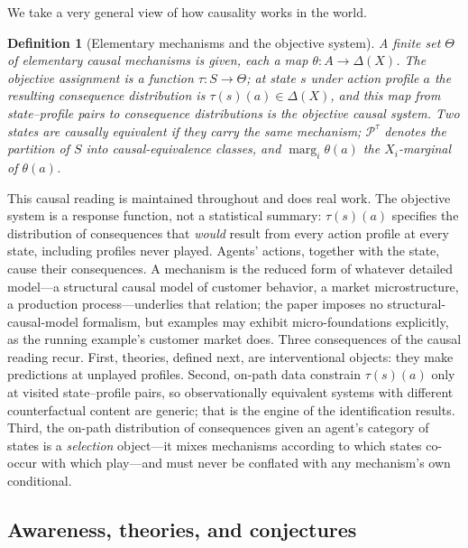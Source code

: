 \documentclass[11pt]{article}
\newtheorem{definition}[assumption]{Definition}
\theoremstyle{definition}
\newcommand{\marg}[1]{\operatorname{marg}_{#1}}
\begin{document}
We take a very general view of how causality works in the world. 


\begin{definition}[Elementary mechanisms and the objective system]
\label{def:mechanisms}
A finite set $\Theta$ of \emph{elementary causal mechanisms} is given, each a map $\theta:A\to\Delta(X)$.
The \emph{objective assignment} is a function $\tau:S\to\Theta$; at state $s$ under action profile $a$ the resulting consequence distribution is $\tau(s)(a)\in\Delta(X)$, and this map from state--profile pairs to consequence distributions is the \emph{objective causal system}.
Two states are \emph{causally equivalent} if they carry the same mechanism; $\mathcal P^{\tau}$ denotes the partition of $S$ into causal-equivalence classes, and $\marg{i}\theta(a)$ the $X_i$-marginal of $\theta(a)$.
\end{definition}

This causal reading is maintained throughout and does real work.
The objective system is a response function, not a statistical summary: $\tau(s)(a)$ specifies the distribution of consequences that \emph{would} result from every action profile at every state, including profiles never played.
Agents' actions, together with the state, cause their consequences.
A mechanism is the reduced form of whatever detailed model---a structural causal model of customer behavior, a market microstructure, a production process---underlies that relation; the paper imposes no structural-causal-model formalism, but examples may exhibit micro-foundations explicitly, as the running example's customer market does.
Three consequences of the causal reading recur.
First, theories, defined next, are interventional objects: they make predictions at unplayed profiles.
Second, on-path data constrain $\tau(s)(a)$ only at visited state--profile pairs, so observationally equivalent systems with different counterfactual content are generic; that is the engine of the identification results.
Third, the on-path distribution of consequences given an agent's category of states is a \emph{selection} object---it mixes mechanisms according to which states co-occur with which play---and must never be conflated with any mechanism's own conditional.

\subsection{Awareness, theories, and conjectures}
\label{sec:awareness-sub}
\end{document}
